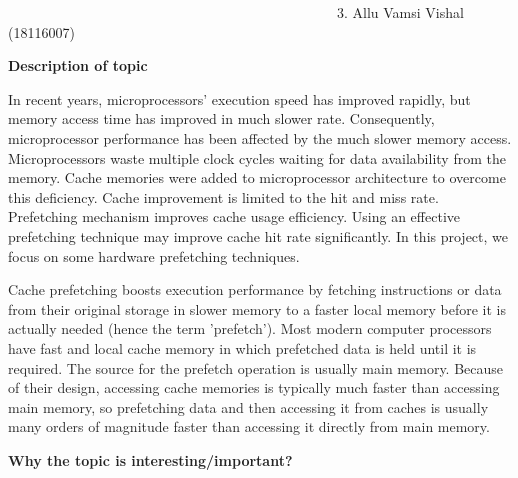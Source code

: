 \documentclass[12pt]{article}
\begin{document}
{\fontsize{15pt}{18.0pt}\selectfont \ \ \ \ \ \ \ \ \ \ \ \ \ \ \ \ \ \ \ \ \ \ \ \ \ \ \ \ \ \ \ \ \ \ \ \ \ \ \ \ \ \ \ \ \ \ \  3. Allu Vamsi Vishal (18116007)\par}\par


\vspace{\baselineskip}
{\fontsize{20pt}{24.0pt}\selectfont \textbf{Description of topic}\par}\par


\vspace{\baselineskip}
{\fontsize{15pt}{18.0pt}\selectfont In recent years, microprocessors’ execution speed has improved rapidly, but memory access time has improved in much slower rate. Consequently, microprocessor performance has been affected by the much slower memory access. Microprocessors waste multiple clock cycles waiting for data availability from the memory. Cache memories were added to microprocessor architecture to overcome this deficiency. Cache improvement is limited to the hit and miss rate. Prefetching mechanism improves cache usage efficiency. Using an effective prefetching technique may improve cache hit rate significantly. In this project, we focus on some hardware prefetching techniques.\par}\par


\vspace{\baselineskip}
{\fontsize{15pt}{18.0pt}\selectfont \textcolor[HTML]{222222}{Cache prefetching boosts execution performance by fetching instructions or data from their original storage in slower memory to a faster local memory before it is actually needed (hence the term 'prefetch'). Most modern computer processors have fast and local cache memory in which prefetched data is held until it is required. The source for the prefetch operation is usually main memory. Because of their design, accessing cache memories is typically much faster than accessing main memory, so prefetching data and then accessing it from caches is usually many orders of magnitude faster than accessing it directly from main memory.}\par}\par


\vspace{\baselineskip}
{\fontsize{20pt}{24.0pt}\selectfont \textbf{\textcolor[HTML]{222222}{Why the topic is interesting/important?}}\par}\par
\end{document}
